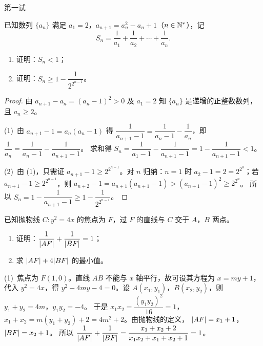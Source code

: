 \documentclass{mojing-exam}
\begin{document}
\begin{paper}[time={8:00—9:20}, full=120]{第一试}

\begin{questions}
\question[14] 已知数列 $\{a_n\}$ 满足 $a_1=2$，$a_{n+1}=a_n^2-a_n+1$（$n\in\mathbb{N}^*$），记
\[ S_n=\frac{1}{a_1}+\frac{1}{a_2}+\dotsb+\frac{1}{a_n} . \]
\begin{enumerate}
  \item 证明：$S_n<1$；
  \item 证明：$S_n\ge1-\dfrac{1}{2^{2^{n-1}}}$。
\end{enumerate}
\answerspace{7cm}
\begin{proof}
由 $a_{n+1}-a_n=(a_n-1)^2>0$ 及 $a_1=2$ 知 $\{a_n\}$ 是递增的正整数数列，且 $a_n\ge2$。

(1)~由 $a_{n+1}-1=a_n(a_n-1)$ 得
$\dfrac{1}{a_{n+1}-1}=\dfrac{1}{a_n-1}-\dfrac{1}{a_n}$，即
$\dfrac{1}{a_n}=\dfrac{1}{a_n-1}-\dfrac{1}{a_{n+1}-1}$。
求和得 $S_n=\dfrac{1}{a_1-1}-\dfrac{1}{a_{n+1}-1}=1-\dfrac{1}{a_{n+1}-1}<1$。

(2)~由 (1)，只需证 $a_{n+1}-1\ge2^{2^{n-1}}$。对 $n$ 归纳：$n=1$ 时 $a_2-1=2=2^{2^0}$；若
$a_{n+1}-1\ge2^{2^{n-1}}$，则
$a_{n+2}-1=a_{n+1}(a_{n+1}-1)>(a_{n+1}-1)^2\ge2^{2^n}$。
所以 $S_n=1-\dfrac{1}{a_{n+1}-1}\ge1-\dfrac{1}{2^{2^{n-1}}}$。
\end{proof}

\question[16]
\begin{withfigure}[.3]{%
  }
已知抛物线 $C\colon y^2=4x$ 的焦点为 $F$，过 $F$ 的直线与 $C$ 交于 $A$，$B$ 两点。
\begin{enumerate}
  \item 证明：$\dfrac{1}{\lvert AF\rvert}+\dfrac{1}{\lvert BF\rvert}=1$；
  \item 求 $\lvert AF\rvert+4\lvert BF\rvert$ 的最小值。
\end{enumerate}
\end{withfigure}
\answerspace{7cm}
\begin{solution}
(1)~焦点为 $F(1,0)$。直线 $AB$ 不能与 $x$ 轴平行，故可设其方程为 $x=my+1$，代入 $y^2=4x$，得
$y^2-4my-4=0$。设 $A(x_1,y_1)$，$B(x_2,y_2)$，则 $y_1+y_2=4m$，$y_1y_2=-4$。
于是 $x_1x_2=\dfrac{(y_1y_2)^2}{16}=1$，$x_1+x_2=m(y_1+y_2)+2=4m^2+2$。由抛物线的定义，
$\lvert AF\rvert=x_1+1$，$\lvert BF\rvert=x_2+1$。
所以 $\dfrac{1}{\lvert AF\rvert}+\dfrac{1}{\lvert BF\rvert}=\dfrac{x_1+x_2+2}{x_1x_2+x_1+x_2+1}=1$。


\end{solution}
\end{questions}
\end{paper}
\end{document}
